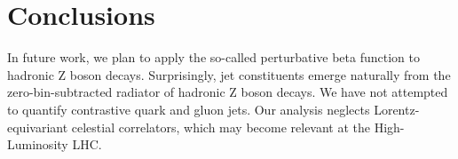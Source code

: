 \section{Conclusions}\label{sec:conclusions}

In future work, we plan to apply the so-called perturbative beta
function to hadronic Z boson decays. Surprisingly, jet constituents
emerge naturally from the zero-bin-subtracted radiator of hadronic Z
boson decays. We have not attempted to quantify contrastive quark and
gluon jets. Our analysis neglects Lorentz-equivariant celestial
correlators, which may become relevant at the High-Luminosity LHC.

